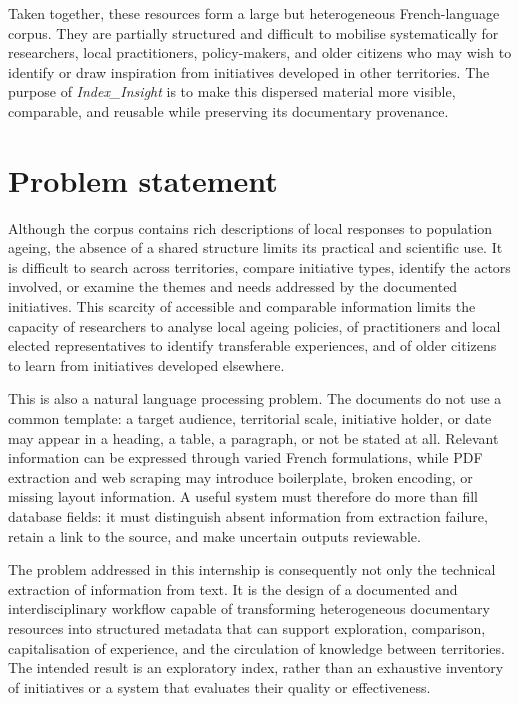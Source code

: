Taken together, these resources form a large but heterogeneous French-language
corpus. They are partially structured and difficult to mobilise systematically for
researchers, local practitioners, policy-makers, and older citizens who may wish
to identify or draw inspiration from initiatives developed in other territories.
The purpose of \textit{Index\_Insight} is to make this dispersed material more
visible, comparable, and reusable while preserving its documentary provenance.

\section{Problem statement}

Although the corpus contains rich descriptions of local responses to population
ageing, the absence of a shared structure limits its practical and scientific use.
It is difficult to search across territories, compare initiative types, identify the
actors involved, or examine the themes and needs addressed by the documented
initiatives. This scarcity of accessible and comparable information limits the
capacity of researchers to analyse local ageing policies, of practitioners and local
elected representatives to identify transferable experiences, and of older citizens
to learn from initiatives developed elsewhere.

This is also a natural language processing problem. The documents do not use a
common template: a target audience, territorial scale, initiative holder, or date
may appear in a heading, a table, a paragraph, or not be stated at all. Relevant
information can be expressed through varied French formulations, while PDF
extraction and web scraping may introduce boilerplate, broken encoding, or missing
layout information. A useful system must therefore do more than fill database
fields: it must distinguish absent information from extraction failure, retain a
link to the source, and make uncertain outputs reviewable.

The problem addressed in this internship is consequently not only the technical
extraction of information from text. It is the design of a documented and
interdisciplinary workflow capable of transforming heterogeneous documentary
resources into structured metadata that can support exploration, comparison,
capitalisation of experience, and the circulation of knowledge between territories.
The intended result is an exploratory index, rather than an exhaustive inventory
of initiatives or a system that evaluates their quality or effectiveness.

